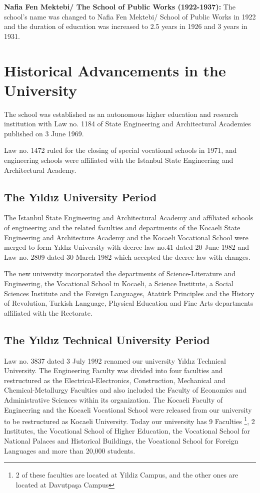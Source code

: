 \textbf{Nafia Fen Mektebi/ The School of Public Works (1922-1937):}  The school’s name was changed to Nafia Fen Mektebi/ School of Public Works in 1922 and the duration of education was increased to 2.5 years in 1926 and 3 years in 1931.

\section{Historical Advancements in the University}

The school was established as an autonomous higher education and research institution with Law no. 1184 of State Engineering and Architectural Academies published on 3 June 1969. 

Law no. 1472 ruled for the closing of special vocational schools in 1971, and engineering schools were affiliated with the Istanbul State Engineering and Architectural Academy.

\subsection{The Yıldız University Period}
The Istanbul State Engineering and Architectural Academy and affiliated schools of engineering and the related faculties and departments of the Kocaeli State Engineering and Architecture Academy and the Kocaeli Vocational School were merged to form Yıldız University with decree law no.41 dated 20 June 1982 and Law no. 2809 dated 30 March 1982 which accepted the decree law with changes.

The new university incorporated the departments of Science-Literature and Engineering, the Vocational School in Kocaeli, a Science Institute, a Social Sciences Institute and the Foreign Languages, Atatürk Principles and the History of Revolution, Turkish Language, Physical Education and Fine Arts departments affiliated with the Rectorate.

\subsection{The Yıldız Technical University Period}
Law no. 3837 dated 3 July 1992 renamed our university Yıldız Technical University. The Engineering Faculty was divided into four faculties and restructured as the Electrical-Electronics, Construction, Mechanical and Chemical-Metallurgy Faculties and also included the Faculty of Economics and Administrative Sciences within its organization. The Kocaeli Faculty of Engineering and the Kocaeli Vocational School were released from our university to be restructured as Kocaeli University. Today our university has 9 Faculties \footnote{2 of these faculties are located at Yildiz Campus, and the other ones are located at Davutpaşa Campus}, 2 Institutes, the Vocational School of Higher Education, the Vocational School for National Palaces and Historical Buildings, the Vocational School for Foreign Languages and more than 20,000 students. 

